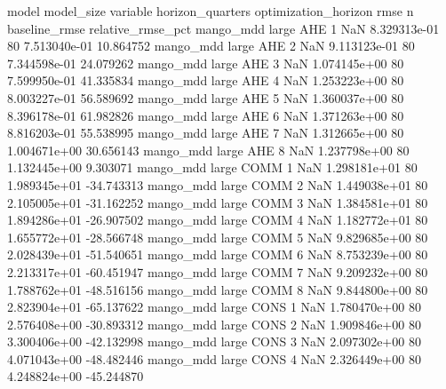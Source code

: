             model model_size variable  horizon_quarters optimization_horizon         rmse  n  baseline_rmse  relative_rmse_pct
        mango_mdd      large      AHE                 1                  NaN 8.329313e-01 80   7.513040e-01          10.864752
        mango_mdd      large      AHE                 2                  NaN 9.113123e-01 80   7.344598e-01          24.079262
        mango_mdd      large      AHE                 3                  NaN 1.074145e+00 80   7.599950e-01          41.335834
        mango_mdd      large      AHE                 4                  NaN 1.253223e+00 80   8.003227e-01          56.589692
        mango_mdd      large      AHE                 5                  NaN 1.360037e+00 80   8.396178e-01          61.982826
        mango_mdd      large      AHE                 6                  NaN 1.371263e+00 80   8.816203e-01          55.538995
        mango_mdd      large      AHE                 7                  NaN 1.312665e+00 80   1.004671e+00          30.656143
        mango_mdd      large      AHE                 8                  NaN 1.237798e+00 80   1.132445e+00           9.303071
        mango_mdd      large     COMM                 1                  NaN 1.298181e+01 80   1.989345e+01         -34.743313
        mango_mdd      large     COMM                 2                  NaN 1.449038e+01 80   2.105005e+01         -31.162252
        mango_mdd      large     COMM                 3                  NaN 1.384581e+01 80   1.894286e+01         -26.907502
        mango_mdd      large     COMM                 4                  NaN 1.182772e+01 80   1.655772e+01         -28.566748
        mango_mdd      large     COMM                 5                  NaN 9.829685e+00 80   2.028439e+01         -51.540651
        mango_mdd      large     COMM                 6                  NaN 8.753239e+00 80   2.213317e+01         -60.451947
        mango_mdd      large     COMM                 7                  NaN 9.209232e+00 80   1.788762e+01         -48.516156
        mango_mdd      large     COMM                 8                  NaN 9.844800e+00 80   2.823904e+01         -65.137622
        mango_mdd      large     CONS                 1                  NaN 1.780470e+00 80   2.576408e+00         -30.893312
        mango_mdd      large     CONS                 2                  NaN 1.909846e+00 80   3.300406e+00         -42.132998
        mango_mdd      large     CONS                 3                  NaN 2.097302e+00 80   4.071043e+00         -48.482446
        mango_mdd      large     CONS                 4                  NaN 2.326449e+00 80   4.248824e+00         -45.244870
